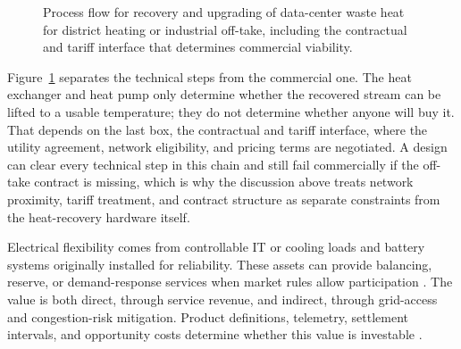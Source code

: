 \documentclass[preprint,12pt]{elsarticle}
\begin{document}
\begin{figure}[H]
\centering
{}
\caption{Process flow for recovery and upgrading of data-center waste heat for district heating or industrial off-take, including the contractual and tariff interface that determines commercial viability.}
\label{fig:heat-recovery-flow}
\end{figure}

Figure~\ref{fig:heat-recovery-flow} separates the technical steps from the commercial one. The heat exchanger and heat pump only determine whether the recovered stream can be lifted to a usable temperature; they do not determine whether anyone will buy it. That depends on the last box, the contractual and tariff interface, where the utility agreement, network eligibility, and pricing terms are negotiated. A design can clear every technical step in this chain and still fail commercially if the off-take contract is missing, which is why the discussion above treats network proximity, tariff treatment, and contract structure as separate constraints from the heat-recovery hardware itself.

Electrical flexibility comes from controllable IT or cooling loads and battery systems originally installed for reliability. These assets can provide balancing, reserve, or demand-response services when market rules allow participation \cite{13,Takci2025}. The value is both direct, through service revenue, and indirect, through grid-access and congestion-risk mitigation. Product definitions, telemetry, settlement intervals, and opportunity costs determine whether this value is investable \cite{Crozier2025}.
\end{document}
